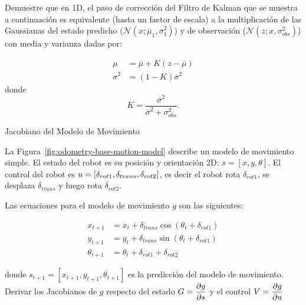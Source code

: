 \documentclass[tp]{lcc}
\begin{document}
    Demuestre que en 1D, el paso de corrección del Filtro de Kalman que se muestra a continuación es equivalente (hasta un factor de escala) a la multiplicación de las Gaussianas del estado predicho ($\mathcal{N}(x;\overline{\mu}_{1},\overline{\sigma}_{1}^{2})$) y de observación ($\mathcal{N}(z;x, \sigma_{obs}^{2})$) con media y varianza dadas por:
    
    \begin{align*}
        \mu &= \overline{\mu} + K (z - \overline{\mu})\\
        \sigma^{2} &= (1 - K) \overline{\sigma}^{2}
    \end{align*}
%
    donde 
    \begin{equation*}
        K = \dfrac{\overline{\sigma}^{2}}{\overline{\sigma}^{2}+\sigma_{obs}^{2}}.
    \end{equation*}
	
	\ejercicio Jacobiano del Modelo de Movimiento
    \label{exercise:jacobian}
    
    La Figura~\ref{fig:odometry-base-motion-model} describe un modelo de movimiento simple. El estado del robot es su posición y orientación 2D: $s = [x, y, \theta]$. El control del robot es $u = [\delta_{rot1}, \delta_{trans}, \delta_{rot2}]$, es decir el robot rota $\delta_{rot1}$, se desplaza $\delta_{trans}$ y luego rota $\delta_{rot2}$.
    
    Las ecuaciones para el modelo de movimiento $g$ son las siguientes:
    
    \begin{align*}
        x_{t+1} &= x_{t} + \delta_{trans} \cos(\theta_{t} + \delta_{rot1})\\
        y_{t+1} &= y_{t} + \delta_{trans} \sin(\theta_{t} + \delta_{rot1})\\
        \theta_{t+1} &= \theta_{t} + \delta_{rot1} + \delta_{rot2}
    \end{align*}

    donde $s_{t+1} = [x_{t+1}, y_{t+1}, \theta_{t+1}]$ es la predicción del modelo de movimiento. Derivar los Jacobianos de $g$ respecto del estado $G = \dfrac{\partial g}{\partial s}$ y el control $V = \dfrac{\partial g}{\partial u}$
    
\end{document}
